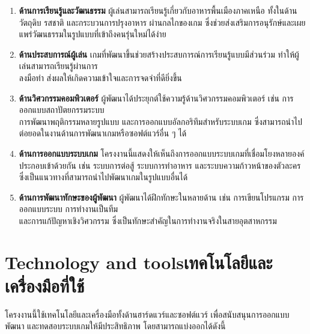     \begin{enumerate}
        \item \textbf{ด้านการเรียนรู้และวัฒนธรรม}\newline
        \hspace{1.5em}ผู้เล่นสามารถเรียนรู้เกี่ยวกับอาหารพื้นเมืองภาคเหนือ ทั้งในด้านวัตถุดิบ รสชาติ และกระบวนการปรุงอาหาร ผ่านกลไกของเกม ซึ่งช่วยส่งเสริมการอนุรักษ์และเผยแพร่วัฒนธรรมในรูปแบบที่เข้าถึงคนรุ่นใหม่ได้ง่าย
        \item \textbf{ด้านประสบการณ์ผู้เล่น}\newline
        \hspace{1.5em}เกมที่พัฒนาขึ้นช่วยสร้างประสบการณ์การเรียนรู้แบบมีส่วนร่วม ทำให้ผู้เล่นสามารถเรียนรู้ผ่านการ\\ลงมือทำ ส่งผลให้เกิดความเข้าใจและการจดจำที่ดียิ่งขึ้น
        \item \textbf{ด้านวิศวกรรมคอมพิวเตอร์}\newline
        \hspace{1.5em}ผู้พัฒนาได้ประยุกต์ใช้ความรู้ด้านวิศวกรรมคอมพิวเตอร์ เช่น การออกแบบสถาปัตยกรรมระบบ \\การพัฒนาพฤติกรรมหลายรูปแบบ และการออกแบบอัลกอริทึมสำหรับระบบเกม ซึ่งสามารถนำไป\\ต่อยอดในงานด้านการพัฒนาเกมหรือซอฟต์แวร์อื่น ๆ ได้
        \item \textbf{ด้านการออกแบบระบบเกม}\newline
        \hspace{1.5em}โครงงานนี้แสดงให้เห็นถึงการออกแบบระบบเกมที่เชื่อมโยงหลายองค์ประกอบเข้าด้วยกัน เช่น ระบบการต่อสู้ ระบบการทำอาหาร และระบบความก้าวหน้าของตัวละคร ซึ่งเป็นแนวทางที่สามารถนำไปพัฒนาเกมในรูปแบบอื่นได้
        \item \textbf{ด้านการพัฒนาทักษะของผู้พัฒนา}\newline
        \hspace{1.5em}ผู้พัฒนาได้ฝึกทักษะในหลายด้าน เช่น การเขียนโปรแกรม การออกแบบระบบ การทำงานเป็นทีม \\และการแก้ปัญหาเชิงวิศวกรรม ซึ่งเป็นทักษะสำคัญในการทำงานจริงในสายอุตสาหกรรม
    \end{enumerate}

\section{\ifenglish Technology and tools\else เทคโนโลยีและเครื่องมือที่ใช้\fi}

    \hspace{1.5em}โครงงานนี้ใช้เทคโนโลยีและเครื่องมือทั้งด้านฮาร์ดแวร์และซอฟต์แวร์ เพื่อสนับสนุนการออกแบบ พัฒนา และทดสอบระบบเกมให้มีประสิทธิภาพ โดยสามารถแบ่งออกได้ดังนี้

